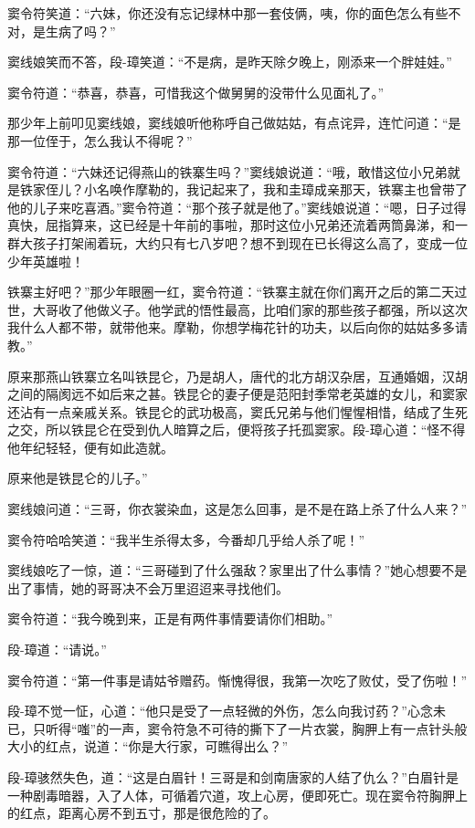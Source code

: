 \documentclass[12pt,oneside]{book}
\begin{document}
窦令符笑道：``六妹，你还没有忘记绿林中那一套伎俩，咦，你的面色怎么有些不对，是生病了吗？''

窦线娘笑而不答，段-璋笑道：``不是病，是昨天除夕晚上，刚添来一个胖娃娃。''

窦令符道：``恭喜，恭喜，可惜我这个做舅舅的没带什么见面礼了。''

那少年上前叩见窦线娘，窦线娘听他称呼自己做姑姑，有点诧异，连忙问道：``是那一位侄于，怎么我认不得呢？''

窦令符道：``六妹还记得燕山的铁寨生吗？''窦线娘说道：``哦，敢惜这位小兄弟就是铁家侄儿？小名唤作摩勒的，我记起来了，我和圭璋成亲那天，铁寨主也曾带了他的儿子来吃喜酒。''窦令符道：``那个孩子就是他了。''窦线娘说道：``嗯，日子过得真快，屈指算来，这已经是十年前的事啦，那时这位小兄弟还流着两筒鼻涕，和一群大孩子打架闹着玩，大约只有七八岁吧？想不到现在已长得这么高了，变成一位少年英雄啦！

铁寨主好吧？''那少年眼圈一红，窦令符道：``铁寨主就在你们离开之后的第二天过世，大哥收了他做义子。他学武的悟性最高，比咱们家的那些孩子都强，所以这次我什么人都不带，就带他来。摩勒，你想学梅花针的功夫，以后向你的姑姑多多请教。''

原来那燕山铁寨立名叫铁昆仑，乃是胡人，唐代的北方胡汉杂居，互通婚姻，汉胡之间的隔阂远不如后来之甚。铁昆仑的妻子便是范阳封季常老英雄的女儿，和窦家还沾有一点亲戚关系。铁昆仑的武功极高，窦氏兄弟与他们惺惺相惜，结成了生死之交，所以铁昆仑在受到仇人暗算之后，便将孩子托孤窦家。段-璋心道：``怪不得他年纪轻轻，便有如此造就。

原来他是铁昆仑的儿子。''

窦线娘问道：``三哥，你衣裳染血，这是怎么回事，是不是在路上杀了什么人来？''

窦令符哈哈笑道：``我半生杀得太多，今番却几乎给人杀了呢！''

窦线娘吃了一惊，道：``三哥碰到了什么强敌？家里出了什么事情？''她心想要不是出了事情，她的哥哥决不会万里迢迢来寻找他们。

窦令符道：``我今晚到来，正是有两件事情要请你们相助。''

段-璋道：``请说。''

窦令符道：``第一件事是请姑爷赠药。惭愧得很，我第一次吃了败仗，受了伤啦！''

段-璋不觉一怔，心道：``他只是受了一点轻微的外伤，怎么向我讨药？''心念未已，只听得``嗤''的一声，窦令符急不可待的撕下了一片衣裳，胸胛上有一点针头般大小的红点，说道：``你是大行家，可瞧得出么？''

段-璋骇然失色，道：``这是白眉针！三哥是和剑南唐家的人结了仇么？''白眉针是一种剧毒暗器，入了人体，可循着穴道，攻上心房，便即死亡。现在窦令符胸胛上的红点，距离心房不到五寸，那是很危险的了。
\end{document}
